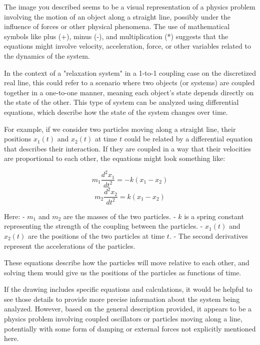The image you described seems to be a visual representation of a physics problem involving the motion of an object along a straight line, possibly under the influence of forces or other physical phenomena. The use of mathematical symbols like plus (+), minus (-), and multiplication (*) suggests that the equations might involve velocity, acceleration, force, or other variables related to the dynamics of the system.

In the context of a "relaxation system" in a 1-to-1 coupling case on the discretized real line, this could refer to a scenario where two objects (or systems) are coupled together in a one-to-one manner, meaning each object's state depends directly on the state of the other. This type of system can be analyzed using differential equations, which describe how the state of the system changes over time.

For example, if we consider two particles moving along a straight line, their positions \(x_1(t)\) and \(x_2(t)\) at time \(t\) could be related by a differential equation that describes their interaction. If they are coupled in a way that their velocities are proportional to each other, the equations might look something like:

\[
m_1 \frac{d^2 x_1}{dt^2} = -k(x_1 - x_2)
\]
\[
m_2 \frac{d^2 x_2}{dt^2} = k(x_1 - x_2)
\]

Here:
- \(m_1\) and \(m_2\) are the masses of the two particles.
- \(k\) is a spring constant representing the strength of the coupling between the particles.
- \(x_1(t)\) and \(x_2(t)\) are the positions of the two particles at time \(t\).
- The second derivatives represent the accelerations of the particles.

These equations describe how the particles will move relative to each other, and solving them would give us the positions of the particles as functions of time.

If the drawing includes specific equations and calculations, it would be helpful to see those details to provide more precise information about the system being analyzed. However, based on the general description provided, it appears to be a physics problem involving coupled oscillators or particles moving along a line, potentially with some form of damping or external forces not explicitly mentioned here.